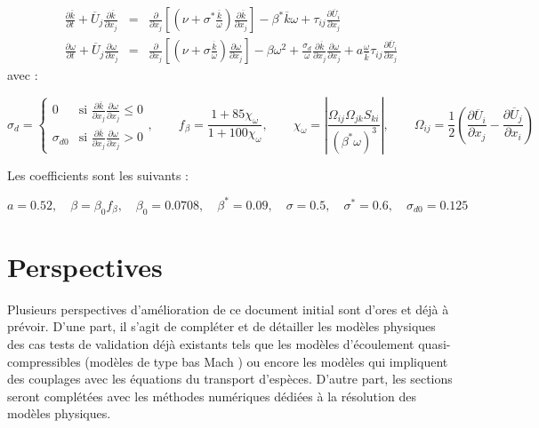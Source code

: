 \begin{eqnarray*}
\frac{\partial\overline{k}}{\partial t}+\overline{U}_{j}\frac{\partial\overline{k}}{\partial x_{j}} & = & \frac{\partial}{\partial x_{j}}\left[\left(\nu+\sigma^{*}\frac{\overline{k}}{\omega}\right)\frac{\partial\overline{k}}{\partial x_{j}}\right]-\beta^{*}\overline{k}\omega+\tau_{ij}\frac{\partial\overline{U}_{i}}{\partial x_{j}}\\
\frac{\partial\omega}{\partial t}+\overline{U}_{j}\frac{\partial\omega}{\partial x_{j}} & = & \frac{\partial}{\partial x_{j}}\left[\left(\nu+\sigma\frac{\overline{k}}{\omega}\right)\frac{\partial\omega}{\partial x_{j}}\right]-\beta\omega^{2}+\frac{\sigma_{d}}{\omega}\frac{\partial\overline{k}}{\partial x_{j}}\frac{\partial\omega}{\partial x_{j}}+a\frac{\omega}{\overline{k}}\tau_{ij}\frac{\partial\overline{U}_{i}}{\partial x_{j}}
\end{eqnarray*}
avec :

\[
\sigma_{d}=\begin{cases}
0 & \mbox{si }\frac{\partial\overline{k}}{\partial x_{j}}\frac{\partial\omega}{\partial x_{j}}\leq0\\
\sigma_{d0} & \mbox{si }\frac{\partial\overline{k}}{\partial x_{j}}\frac{\partial\omega}{\partial x_{j}}>0
\end{cases},\qquad f_{\beta}=\frac{1+85\chi_{\omega}}{1+100\chi_{\omega}},\qquad\chi_{\omega}=\left|\frac{\Omega_{ij}\Omega_{jk}S_{ki}}{(\beta^{*}\omega)^{3}}\right|,\qquad\Omega_{ij}=\frac{1}{2}\left(\frac{\partial\overline{U}_{i}}{\partial x_{j}}-\frac{\partial\overline{U}_{j}}{\partial x_{i}}\right)
\]


Les coefficients sont les suivants :

\[
a=0.52,\quad\beta=\beta_{0}f_{\beta},\quad\beta_{0}=0.0708,\quad\beta^{*}=0.09,\quad\sigma=0.5,\quad\sigma^{*}=0.6,\quad\sigma_{d0}=0.125
\]



\section{Perspectives}

Plusieurs perspectives d'am\'elioration de ce document initial sont
d'ores et d\'ej\`a \`a pr\'evoir. D'une part, il s'agit de compl\'eter et de
d\'etailler les mod\`eles physiques des cas tests de validation d\'ej\`a existants
tels que les mod\`eles d'\'ecoulement quasi-compressibles (mod\`eles de
type \og bas Mach \fg{}) ou encore les mod\`eles qui impliquent des
couplages avec les \'equations du transport d'esp\`eces. D'autre part,
les sections seront compl\'et\'ees avec les m\'ethodes num\'eriques d\'edi\'ees
\`a la r\'esolution des mod\`eles physiques.

